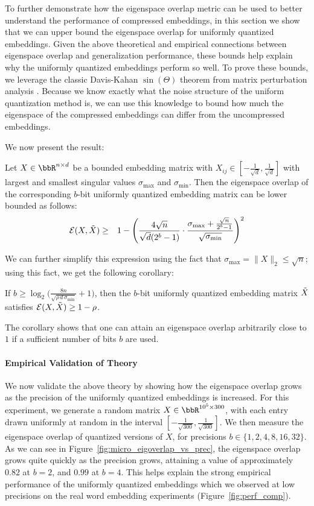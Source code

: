 To further demonstrate how the eigenspace overlap metric can be used to better understand the performance of compressed embeddings, in this section we show that we can upper bound the eigenspace overlap for uniformly quantized embeddings.
Given the above theoretical and empirical connections between eigenspace overlap and generalization performance, these bounds help explain why the uniformly quantized embeddings perform so well.
To prove these bounds, we leverage the classic Davis-Kahan $\sin(\Theta)$ theorem from matrix perturbation analysis \citep{sintheta70}.
Because we know exactly what the noise structure of the uniform quantization method is, we can use this knowledge to bound how much the eigenspace of the compressed embeddings can differ from the uncompressed embeddings.

We now present the result:
\begin{theorem}
	Let $X \in \RR^{n\times d}$ be a bounded embedding matrix with $X_{ij} \in [-\frac{1}{\sqrt{d}},\frac{1}{\sqrt{d}}]$ with largest and smallest singular values $\sigma_{\max}$ and $\sigma_{\min}$.
	Then the eigenspace overlap of the corresponding $b$-bit uniformly quantized embedding matrix can be lower bounded as follows:
	\begin{eqnarray*}
		\eigover(X,\tX) &\geq& 1 - \Bigg(\frac{4\sqrt{n}}{\sqrt{d}(2^b-1)} \cdot \frac{\sigma_{\max} + \frac{\sqrt{n}}{2^b-1} }{\sqrt{\sigma_{\min}}} \Bigg)^2
	\end{eqnarray*}
\label{thm1}
\end{theorem}
We can further simplify this expression using the fact that $\sigma_{\max} = \|X\|_2 \leq \sqrt{n}$; using this fact, we get the following corollary:
\begin{corollary}
If $b \geq \log_2\bigg(\frac{8n}{\sqrt{\rho \, d\, \sigma_{\min}}} + 1\bigg)$, then the $b$-bit uniformly quantized embedding matrix $\tX$ satisfies $\eigover(X,\tX) \geq 1-\rho$.
\end{corollary}

The corollary shows that one can attain an eigenspace overlap arbitrarily close to $1$ if a sufficient number of bits $b$ are used.

\paragraph{Empirical Validation of Theory}
We now validate the above theory by showing how the eigenspace overlap grows as the precision of the uniformly quantized embeddings is increased.
For this experiment, we generate a random matrix $X \in \RR^{10^5 \times 300}$, with each entry drawn uniformly at random in the interval $[-\frac{1}{\sqrt{300}}, \frac{1}{\sqrt{300}}]$.
We then measure the eigenspace overlap of quantized versions of $X$, for precisions $b \in \{1,2,4,8,16,32\}$.
As we can see in Figure~\ref{fig:micro_eigoverlap_vs_prec}, the eigenspace overlap grows quite quickly as the precision grows, attaining a value of approximately $0.82$ at $b=2$, and $0.99$ at $b=4$.
This helps explain the strong empirical performance of the uniformly quantized embeddings which we observed at low precisions on the real word embedding experiments (Figure~\ref{fig:perf_comp}).

